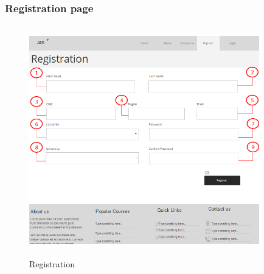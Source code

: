 \documentclass[12pt]{article}
\begin{document}
\subsubsection{Registration page}
\begin{figure}[h]
  \centering
  \includegraphics[width=10cm, height=10cm]{RegistrationPage}
  \caption{Registration}
\end{figure}
\end{document}
